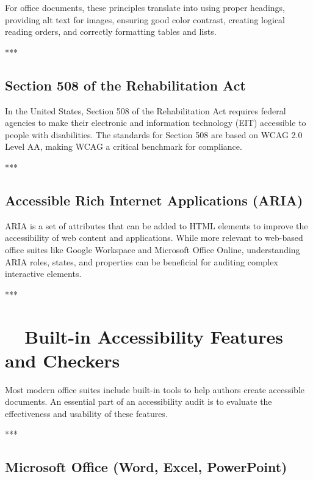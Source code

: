 For office documents, these principles translate into using proper headings, providing alt text for images, ensuring good color contrast, creating logical reading orders, and correctly formatting tables and lists.

***

\subsection{Section 508 of the Rehabilitation Act}
\label{sub:section-508-of-the-rehabilitation-act}

In the United States, Section 508 of the Rehabilitation Act requires federal agencies to make their electronic and information technology (EIT) accessible to people with disabilities. The standards for Section 508 are based on WCAG 2.0 Level AA, making \gls{WCAG} a critical benchmark for compliance\supercite{Section508}.

***

\subsection{Accessible Rich Internet Applications (ARIA)}
\label{sub:accessible-rich-internet-applications-aria}

\gls{ARIA} is a set of attributes that can be added to HTML elements to improve the accessibility of web content and applications. While more relevant to web-based office suites like Google Workspace and Microsoft Office Online, understanding \gls{ARIA} roles, states, and properties can be beneficial for auditing complex interactive elements\supercite{w3caria}.

***

\section{~~Built-in Accessibility Features and Checkers}
\label{sec:built-in-accessibility-features-and-checkers}

Most modern office suites include built-in tools to help authors create accessible documents. An essential part of an accessibility audit is to evaluate the effectiveness and usability of these features.

***

\subsection{Microsoft Office (Word, Excel, PowerPoint)}
\label{sub:microsoft-office-word-excel-powerpoint}

